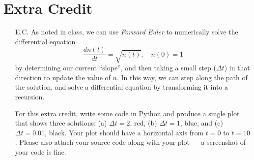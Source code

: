 \documentclass[11pt,onecolumn,superscriptaddress,notitlepage]{article}
\begin{document}
\vspace{0.5in}
\section*{Extra Credit}
\begin{enumerate}[resume]
\item[E.C.] As noted in class, we can use {\it Forward Euler} to numerically solve the differential equation$$\frac{dn(t)}{dt}=\sqrt{n(t)},\quad n(0)=1$$
by determining our current ``slope'', and then taking a small step ($\Delta t$) in that direction to update the value of $n$. In this way, we can step along the path of the solution, and solve a differential equation by transforming it into a recursion. 

For this extra credit, write some code in Python and produce a single plot that shows three solutions: (a) $\Delta t = 2$, red, (b) $\Delta t = 1$, blue, and (c) $\Delta t = 0.01$, black.  Your plot should have a horizontal axis from $t=0$ to $t=10$. Please also attach your source code along with your plot --- a screenshot of your code is fine. 
\end{enumerate}


\end{document}
